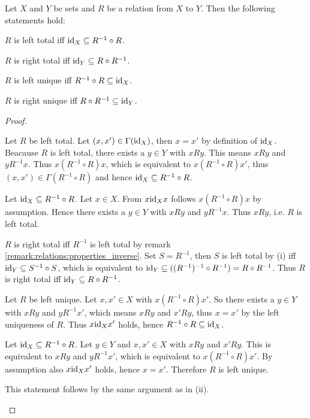 \begin{theorem}\label{theorem:relations:compositions_total_and_unique}
    Let $X$ and $Y$ be sets and $R$ be a relation from $X$ to $Y$. Then the following statements hold:
    \begin{intheoremenumerate}
        \item $R$ is left total iff $\text{id}_X\subseteq R^{-1}\circ R$.
        \item $R$ is right total iff $\text{id}_Y\subseteq R\circ R^{-1}$.
        \item $R$ is left unique iff $R^{-1}\circ R\subseteq \text{id}_X$.
        \item $R$ is right unique iff $R\circ R^{-1}\subseteq\text{id}_Y$.
    \end{intheoremenumerate}
\end{theorem}

\begin{proof}
    \begin{proofenumerate}
        \item \proofright Let $R$ be left total. Let $(x,x')\in\Gamma(\text{id}_X)$, then $x=x'$ by definition of $\text{id}_X$. Beacause $R$ is left total, there exists a $y\in Y$ with $x R y$. This means $x R y$ and $y R^{-1} x$. Thus $x(R^{-1}\circ R) x$, which is equivalent to $x(R^{-1}\circ R)x'$, thus $(x,x')\in\Gamma(R^{-1}\circ R)$ and hence $\text{id}_X\subseteq R^{-1}\circ R$.
        
        \proofleft Let $\text{id}_X\subseteq R^{-1}\circ R$. Let $x\in X$. From $x\text{id}_X x$ follows $x(R^{-1}\circ R)x$ by assumption. Hence there exists a $y\in Y$ with $x R y$ and $y R^{-1} x$. Thus $x R y$, i.e. $R$ is left total.

        \item $R$ is right total iff $R^{-1}$ is left total by remark \ref{remark:relations:properties_inverse}. Set $S=R^{-1}$, then $S$ is left total by (i) iff $\text{id}_Y\subseteq S^{-1}\circ S$, which is equivalent to $\text{id}_Y\subseteq ((R^{-1})^{-1}\circ R^{-1})=R\circ R^{-1}$. Thus $R$ is right total iff $\text{id}_Y\subseteq R\circ R^{-1}$.
        
        \item \proofright Let $R$ be left unique. Let $x,x'\in X$ with $x(R^{-1}\circ R)x'$. So there exists a $y\in Y$ with $x R y$ and $y R^{-1} x'$, which means $x R y$ and $x' R y$, thus $x=x'$ by the left uniqueness of $R$. Thus $x\text{id}_X x'$ holds, hence $R^{-1}\circ R\subseteq \text{id}_X$.
        
        \proofleft Let $\text{id}_X\subseteq R^{-1}\circ R$. Let $y\in Y$ and $x,x'\in X$ with $x R y$ and $x' R y$. This is equivalent to $x R y$ and $y R^{-1} x'$, which is equivalent to $x (R^{-1}\circ R)x'$. By assumption also $x\text{id}_X x'$ holds, hence $x=x'$. Therefore $R$ is left unique.

        \item This statement follows by the same argument as in (ii).
    \end{proofenumerate}
\end{proof}

